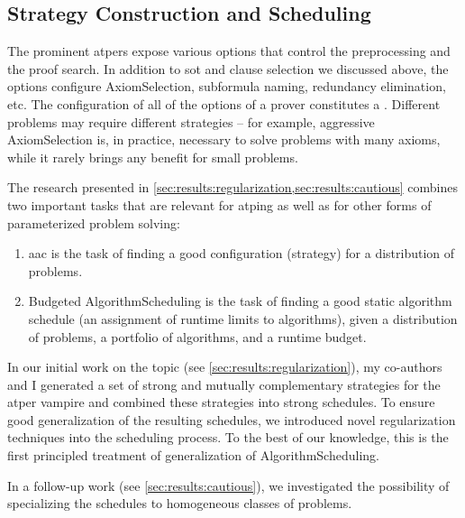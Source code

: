 
\subsection{Strategy Construction and Scheduling}
\label{sec:contrib:schedules}

The prominent \glspl{atper} expose various options that control the preprocessing and the proof search.
In addition to \gls{sot} and clause selection we discussed above,
the options configure \gls{AxiomSelection}, subformula naming, redundancy elimination, etc.
The configuration of all of the options of a prover constitutes a .
Different problems may require different strategies -- for example, aggressive \gls{AxiomSelection} is, in practice, necessary to solve problems with many axioms, while it rarely brings any benefit for small problems.

The research presented in \cref{sec:results:regularization,sec:results:cautious} combines two important tasks
that are relevant for \gls{atping} as well as for other forms of parameterized problem solving:
\begin{enumerate}
\item \Gls{aac} \cite{DBLP:journals/jair/SchedeBTWBHT22} is the task of finding a good configuration (strategy) for a distribution of problems.
\item Budgeted \gls{AlgorithmScheduling} \cite{DBLP:journals/ec/KerschkeHNT19} is the task of finding a good static algorithm schedule (an assignment of runtime limits to algorithms), given a distribution of problems, a portfolio of algorithms, and a runtime budget.
\end{enumerate}

In our initial work on the topic \cite{DBLP:conf/ijcar/BartekCS24} (see \cref{sec:results:regularization}),
my co-authors and I generated a set of strong and mutually complementary strategies for the \gls{atper} \gls{vampire}
and combined these strategies into strong schedules.
To ensure good generalization of the resulting schedules,
we introduced novel regularization techniques into the scheduling process.
To the best of our knowledge, this is the first principled treatment of generalization of \gls{AlgorithmScheduling}.

In a follow-up work \cite{DBLP:conf/paar/BartekC024} (see \cref{sec:results:cautious}), we investigated the possibility of specializing the schedules to homogeneous classes of problems.

